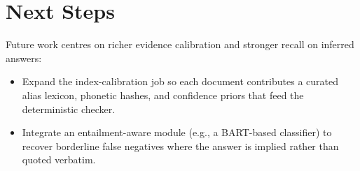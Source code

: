 \documentclass[11pt]{article}
\begin{document}
\section{Next Steps}
Future work centres on richer evidence calibration and stronger recall on inferred answers:
\begin{itemize}
  \item Expand the index-calibration job so each document contributes a curated alias lexicon, phonetic hashes, and confidence priors that feed the deterministic checker.
  \item Integrate an entailment-aware module (e.g., a BART-based classifier) to recover borderline false negatives where the answer is implied rather than quoted verbatim.
\end{itemize}
\end{document}
